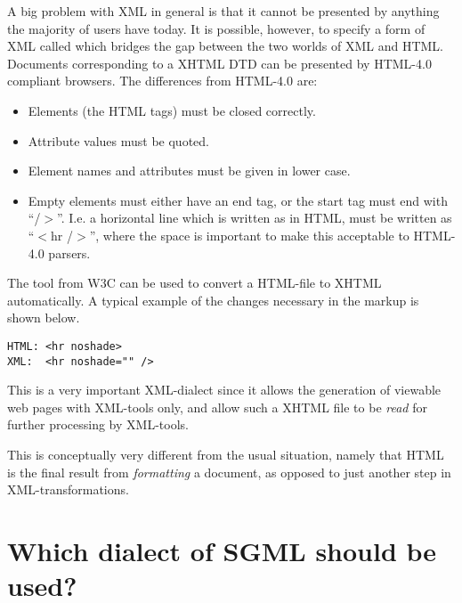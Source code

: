 A big problem with XML in general is that it cannot be presented by
anything the majority of users have today.  It is possible, however,
to specify a form of XML called
 which bridges the gap
between the two worlds of XML and HTML.  Documents corresponding to a
XHTML DTD can be presented by HTML-4.0 compliant browsers.  The
differences from HTML-4.0 are:

\begin{itemize}
\item Elements (the HTML tags) must be closed correctly.
  
\item Attribute values must be quoted.
\item Element names and attributes must be given in lower case.
  
\item Empty elements must either have an end tag, or the start tag
must end with ``/$>$''.  I.e. a horizontal line which is written as
 in HTML, must be written as ``$<$hr /$>$'', where the space
is important to make this acceptable to HTML-4.0 parsers.
\end{itemize}

The  tool from W3C can be used to
convert a HTML-file to XHTML automatically.  A typical example of the
changes necessary in the markup is shown below.

\begin{verbatim}
HTML: <hr noshade>
XML:  <hr noshade="" />
\end{verbatim}

This is a very important XML-dialect since it allows the generation of
viewable web pages with XML-tools only, and allow such a XHTML file to
be \textit{read} for further processing by XML-tools.

This is conceptually very different from the usual situation, namely
that HTML is the final result from \textit{formatting} a document, as
opposed to just another step in XML-transformations.




\section{Which dialect of SGML should be used?}

